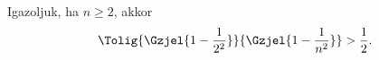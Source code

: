 Igazoljuk, ha $n\ge 2$, akkor 
$$
\Tolig{\Gzjel{1-\frac{1}{2^2}}}{\Gzjel{1-\frac{1}{n^2}}} > \frac{1}{2}.
$$
